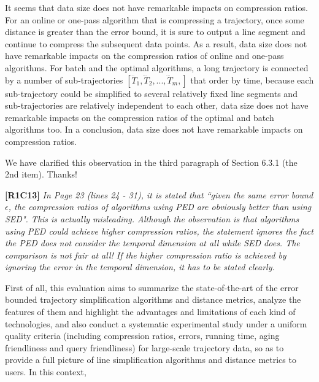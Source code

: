 \documentclass{letter}
\begin{document}
{It seems that data size does not have remarkable impacts on compression ratios. For an online or one-pass algorithm that is compressing a trajectory, once some distance is greater than the error bound, it is sure to output a line segment and continue to compress the subsequent data points. As a result, data size does not have remarkable impacts on the compression ratios of online and one-pass algorithms. 
For batch and the optimal algorithms, a long trajectory is connected by a number of sub-trajectories $[\dddot{T}_1,\dddot{T}_2,..., \dddot{T}_m, ]$ that order by time, because each sub-trajectory could be simplified to several relatively fixed line segments and sub-trajectories are relatively independent to each other, data size does not have remarkable impacts on the compression ratios of the optimal and batch algorithms too.
In a conclusion, data size does not have remarkable impacts on compression ratios. 

We have clarified this observation in the third paragraph of Section 6.3.1 (the 2{nd} item). Thanks!



\textbf{[R1C13]} \emph{ In Page 23 (lines 24 - 31), it is stated that ``given the same error bound $\epsilon$, the compression ratios of algorithms using PED are obviously better than using SED". This is actually misleading. Although the observation is that algorithms using PED could achieve higher compression ratios, the statement ignores the fact the PED does not consider the temporal dimension at all while SED does. The comparison is not fair at all! If the higher compression ratio is achieved by ignoring the error in the temporal dimension, it has to be stated clearly.} 

First of all, this evaluation aims to summarize the state-of-the-art of the error bounded trajectory simplification algorithms and distance metrics, analyze the features of them and highlight the advantages and limitations of each kind of technologies, and also conduct a systematic experimental study under a uniform quality criteria (including compression ratios, errors, running time, aging friendliness and query friendliness) for large-scale trajectory data, so as to provide a full picture of line simplification algorithms and distance metrics to users. In this context,

}
\end{document}
